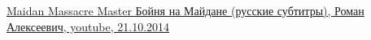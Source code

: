  
 
 
 
 

\href{https://www.youtube.com/watch?v=zV-TZQKgAPE}{%
Maidan Massacre Master Бойня на Майдане (русские субтитры), %
Роман Алексеевич, youtube, 21.10.2014%
}










